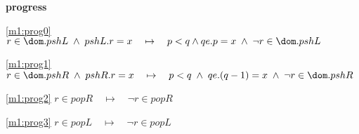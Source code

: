 \textbf{progress}
\begin{block}
\item[ \eqref{m1:prog0} ]$r \in \dom.pshL \1\land pshL.r = x  \quad \mapsto\quad p < q \land qe.p = x \1\land \neg r \in \dom.pshL $ %
\item[ \eqref{m1:prog1} ]$r \in \dom.pshR \1\land pshR.r = x  \quad \mapsto\quad p < q \1\land qe.(q-1) = x \1\land \neg r \in \dom.pshR $ %
\item[ \eqref{m1:prog2} ]$r \in popR  \quad \mapsto\quad \neg r \in popR $ %
\item[ \eqref{m1:prog3} ]$r \in popL  \quad \mapsto\quad \neg r \in popL  $ %
\end{block}
